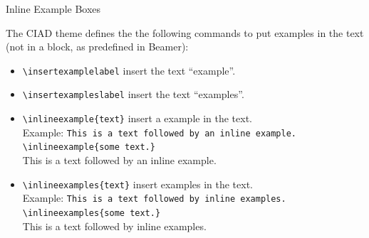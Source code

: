 \documentclass[english,sectioncirclenumberstyle]{ciadbeamer}
\begin{document}
\begin{frame}{Inline Example Boxes}
	\begin{small}
	The CIAD theme defines the the following commands to put examples in the text (not in a block, as predefined in Beamer):
	\begin{itemize}
	\item \texttt{{\textbackslash}insertexamplelabel} insert the text ``example''.
	\item \texttt{{\textbackslash}insertexampleslabel} insert the text ``examples''.
	\vspace{1em}
	\item \texttt{{\textbackslash}inlineexample\{text\}} insert a example in the text. \\
		Example: \texttt{This is a text followed by an inline example. {\textbackslash}inlineexample\{some text.\}} \\
		This is a text followed by an inline example. 
	\item \texttt{{\textbackslash}inlineexamples\{text\}} insert examples in the text. \\
		Example: \texttt{This is a text followed by inline examples. {\textbackslash}inlineexamples\{some text.\}} \\
		This is a text followed by inline examples. 
	\end{itemize}
	\end{small}
\end{frame}
\end{document}
